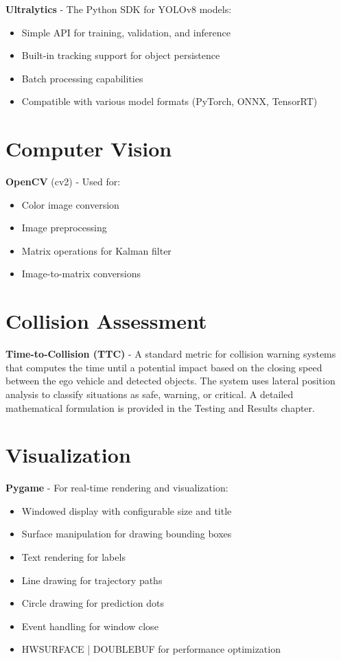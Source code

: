 \textbf{Ultralytics} - The Python SDK for YOLOv8 models:
\begin{itemize}
    \item Simple API for training, validation, and inference
    \item Built-in tracking support for object persistence
    \item Batch processing capabilities
    \item Compatible with various model formats (PyTorch, ONNX, TensorRT)
\end{itemize}

\section{Computer Vision}

\textbf{OpenCV} (cv2) - Used for:
\begin{itemize}
    \item Color image conversion
    \item Image preprocessing
    \item Matrix operations for Kalman filter
    \item Image-to-matrix conversions
\end{itemize}




\section{Collision Assessment}

\textbf{Time-to-Collision (TTC)} - A standard metric for collision warning systems that computes the time until a potential impact based on the closing speed between the ego vehicle and detected objects. The system uses lateral position analysis to classify situations as safe, warning, or critical. A detailed mathematical formulation is provided in the Testing and Results chapter.

\section{Visualization}

\textbf{Pygame} - For real-time rendering and visualization:
\begin{itemize}
    \item Windowed display with configurable size and title
    \item Surface manipulation for drawing bounding boxes
    \item Text rendering for labels
    \item Line drawing for trajectory paths
    \item Circle drawing for prediction dots
    \item Event handling for window close
    \item HWSURFACE | DOUBLEBUF for performance optimization
\end{itemize}

